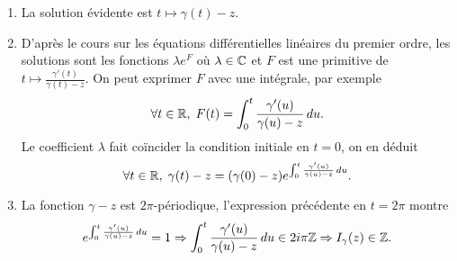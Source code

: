 \begin{enumerate}
 \item La solution évidente est $t\mapsto \gamma(t) - z$.
 \item D'après le cours sur les équations différentielles linéaires du premier ordre, les solutions sont les fonctions $\lambda e^{F}$ où $\lambda \in \mathbb{C}$ et $F$ est une primitive de $t \mapsto \frac{\gamma'(t)}{\gamma(t) - z}$. On peut exprimer $F$ avec une intégrale, par exemple 
\[
 \forall t \in  \mathbb{R}, \; F(t) = \int_0^t \frac{\gamma'(u)}{\gamma(u) - z}\, du.
\]
Le coefficient $\lambda$ fait coïncider la condition initiale en $t=0$, on en déduit
\[
 \forall t \in \mathbb{R}, \;
 \gamma(t) - z = (\gamma(0) - z)e^{\int_0^t \frac{\gamma'(u)}{\gamma(u) - z}\, du} .
\]

 \item La fonction $\gamma -z$ est $2\pi$-périodique, l'expression précédente en $t = 2\pi$ montre 
\[
e^{\int_0^t \frac{\gamma'(u)}{\gamma(u) - z}\, du} = 1
\Rightarrow \int_0^t \frac{\gamma'(u)}{\gamma(u) - z}\, du \in 2i\pi \mathbb{Z} \Rightarrow I_\gamma(z) \in \mathbb{Z}.
\]

\end{enumerate}

